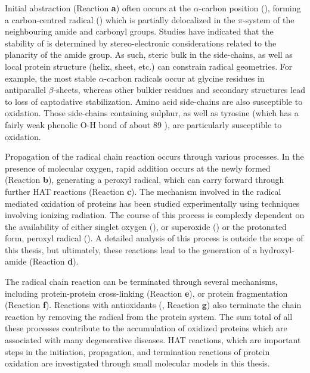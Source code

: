 Initial abstraction (Reaction \textbf{a}) often occurs at the $\alpha$-carbon
position (), forming a carbon-centred radical
() which is partially delocalized in the $\pi$-system of the
neighbouring amide and carbonyl groups. Studies have indicated that the
stability of  is determined by stereo-electronic considerations
related to the planarity of the amide group.\cite{Salamone2014b} As such, steric
bulk in the side-chains, as well as local protein structure (helix, sheet, etc.)
can constrain radical geometries. For example, the most stable $\alpha$-carbon
radicals occur at glycine residues in antiparallel $\beta$-sheets, whereas other
bulkier residues and secondary structures lead to loss of captodative
stabilization.\cite{Rauk2000} Amino acid side-chains are also susceptible to
oxidation. Those side-chains containing sulphur,\cite{Stadtman2004} as well as
tyrosine (which has a fairly weak phenolic O-H bond of about 89
\kcalmol),\cite{Mulder2005} are particularly susceptible to oxidation.

Propagation of the radical chain reaction occurs through various processes. In
the presence of molecular oxygen, rapid addition occurs at the newly formed
 (Reaction \textbf{b}), generating a peroxyl radical, which can
carry forward through further HAT reactions (Reaction
\textbf{c}).\cite{Stadtman2003} The mechanism involved in the radical mediated
oxidation of proteins has been studied experimentally using techniques involving
ionizing radiation.\cite{Garrison1962,Garrison1987} The course of this process
is complexly dependent on the availability of either singlet oxygen (),
or superoxide () or the protonated form, peroxyl radical
(). A detailed analysis of this process is outside the scope of this
thesis, but ultimately, these reactions lead to the generation of a
hydroxyl-amide (Reaction \textbf{d}).

The radical chain reaction can be terminated through several mechanisms,
including protein-protein cross-linking (Reaction \textbf{e}), or protein
fragmentation (Reaction \textbf{f}). Reactions with antioxidants (,
Reaction \textbf{g}) also terminate the chain reaction by removing the radical
from the protein system. The sum total of all these processes contribute to the
accumulation of oxidized proteins which are associated with many degenerative
diseases.\cite{Halliwell2006} HAT reactions, which are important steps in the
initiation, propagation, and termination reactions of protein oxidation are
investigated through small molecular models in this thesis.


